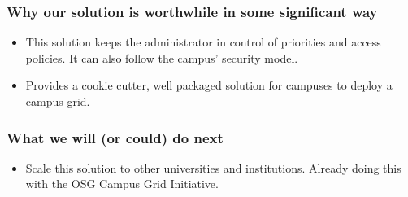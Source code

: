 \documentclass[11pt]{article}
\begin{document}
\subsubsection*{Why our solution is worthwhile in some significant way}
\begin{itemize}


\item
This solution keeps the administrator in control of priorities and access policies.  It can also follow the campus' security model.

\end{itemize}



\begin{itemize}


\item
Provides a cookie cutter, well packaged solution for campuses to deploy a campus grid.

\end{itemize}



\subsubsection*{What we will (or could) do next}
\begin{itemize}

\item 
Scale this solution to other universities and institutions.  Already doing this with the OSG Campus Grid Initiative.

\end{itemize}






\end{document}
